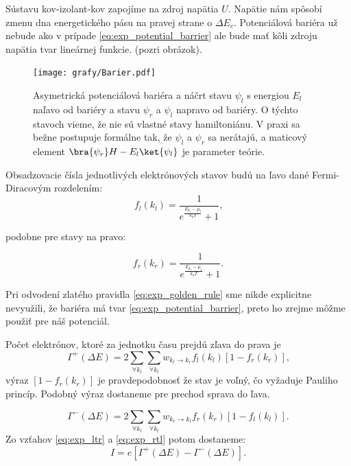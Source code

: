 Sústavu kov-izolant-kov zapojíme na zdroj napätia $U$. Napätie nám spôsobí zmenu dna energetického pásu na pravej strane o $\Delta E_c$.
Potenciálová bariéra už nebude ako v prípade \eqref{eq:exp_potential_barrier} ale bude mať kôli zdroju napätia tvar lineárnej funkcie.
(pozri obrázok).
\begin{figure}[H]
\centering
 \texttt{[image: grafy/Barier.pdf]}
 \caption{Asymetrická potenciálová bariéra a náčrt stavu $\psi_l$ s energiou $E_l$ naľavo
 od bariéry a stavu $\psi_r$ a $\psi_l$ napravo od bariéry. O týchto stavoch
 vieme, že nie sú vlastné stavy hamiltoniánu. V praxi sa bežne postupuje formálne tak, 
 že $\psi_l$ a $\psi_r$ sa  nerátajú, a maticový element ${\bra{\psi_r}H-E_l\ket{\psi_l}}$
 je parameter teórie.}
\end{figure}


Obsadzovacie čísla jednotlivých elektrónových stavov budú na ľavo dané Fermi-Diracovým rozdelením:
\begin{equation}
 \label{eq:exp_fermidirac_left}
 f_l(k_l)=\frac{1}{e^{\frac{E_{k_l}-\mu_l}{k_bT}}+1}\text{,}
\end{equation} 

podobne pre stavy na pravo:

\begin{equation}
 \label{eq:exp_fermidirac_right}
 f_r(k_r)=\frac{1}{e^{\frac{E_{k_r}-\mu_r}{k_bT}}+1}\text{.}
\end{equation} 

Pri odvodení zlatého pravidla \eqref{eq:exp_golden_rule} sme nikde explicitne nevyužili, že bariéra má tvar
\eqref{eq:exp_potential_barrier}, preto ho zrejme môžme použiť pre náš potenciál.

Počet elektrónov, ktoré za jednotku času prejdú zľava do prava je 
\begin{equation}
 \label{eq:exp_ltr}
 \Gamma^+(\Delta E)=2\sum_{\forall k_l}\sum_{\forall k_l} w_{k_l\to k_r} f_l(k_l)[1-f_r(k_r)]\text{,}
\end{equation} 
výraz $[1-f_r(k_r)]$ je pravdepodobnosť že stav je voľný, čo vyžaduje Pauliho princíp. Podobný výraz dostaneme pre prechod sprava do ľava.

\begin{equation}
 \label{eq:exp_rtl}
 \Gamma^-(\Delta E)=2\sum_{\forall k_l}\sum_{\forall k_l} w_{k_r\to k_l} f_r(k_r)[1-f_l(k_l)]\text{.}
\end{equation} 
Zo vzťahov \eqref{eq:exp_ltr} a \eqref{eq:exp_rtl} potom dostaneme:
\begin{equation}
 \label{eq:exp_current}
 I=e[\Gamma^+(\Delta E)-\Gamma^-(\Delta E)] \text{.}
\end{equation} 

